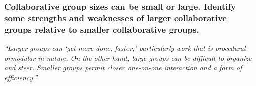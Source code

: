\documentclass[12pt]{beamer}
\newcommand\ans[1]{{\it ``#1''}}
\begin{document}
\begin{frame} %
\frametitle{ Collaborative group sizes can be small or large. Identify some strengths and weaknesses of larger collaborative groups relative to smaller collaborative groups.
}

\ans{Larger  groups  can  `get  more  done,  faster,'  particularly  work  that  is  procedural  ormodular in nature.  On the other hand, large groups can be difficult to organize and steer.  Smaller groups permit closer one-on-one interaction and a form of efficiency.}













\end{frame}
\end{document}

